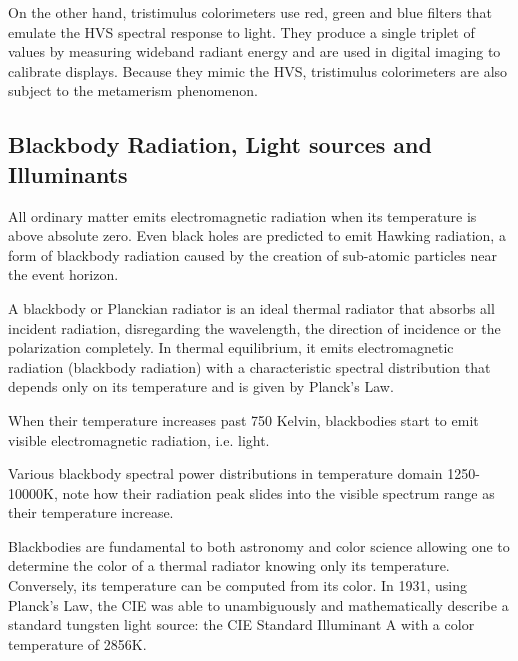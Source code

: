 On the other hand, tristimulus colorimeters use red, green and blue filters that emulate the HVS spectral response to light. They produce a single triplet of values by measuring wideband radiant energy and are used in digital imaging to calibrate displays. Because they mimic the HVS, tristimulus colorimeters are also subject to the metamerism phenomenon.

\subsection{Blackbody Radiation, Light sources and Illuminants}

All ordinary matter emits electromagnetic radiation when its temperature is above absolute zero. Even black holes are predicted to emit Hawking radiation, a form of blackbody radiation caused by the creation of sub-atomic particles near the event horizon. 

A blackbody or Planckian radiator is an ideal thermal radiator that absorbs all incident radiation, disregarding the wavelength, the direction of incidence or the polarization completely. In thermal equilibrium, it emits electromagnetic radiation (blackbody radiation) with a characteristic spectral distribution that depends only on its temperature and is given by Planck's Law.



When their temperature increases past 750 Kelvin, blackbodies start to emit visible electromagnetic radiation, i.e. light.

Various blackbody spectral power distributions in temperature domain 1250-10000K, note how their radiation peak slides into the visible spectrum range as their temperature increase.

Blackbodies are fundamental to both astronomy and color science allowing one to determine the color of a thermal radiator knowing only its temperature. Conversely, its temperature can be computed from its color.
In 1931, using Planck's Law, the CIE was able to unambiguously and mathematically describe a standard tungsten light source: the CIE Standard Illuminant A with a color temperature of 2856K. 



